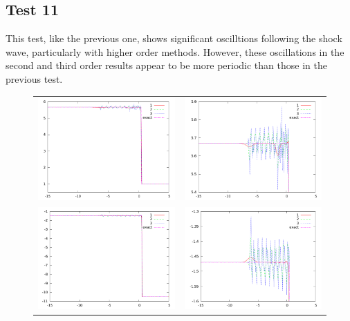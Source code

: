 \documentclass[10pt]{article}
\begin{document}
\subsection{Test 11}
This test, like the previous one, shows significant oscilltions following the shock wave, particularly with higher order methods. However, these oscillations in the second and third order results appear to be more periodic than those in the previous test. 
\begin{figure}[h]
  \begin{center}
	\begin{tabular}{cc}
      \includegraphics[width=.4\textwidth]{den_T11.png} &
	  \includegraphics[width=.4\textwidth]{den11zoom.png} \\
	  \includegraphics[width=.4\textwidth]{vel_T11.png} &	
	  \includegraphics[width=.4\textwidth]{vel11zoom.png} \\

\end{tabular}
\end{center}
\end{figure}
\end{document}
